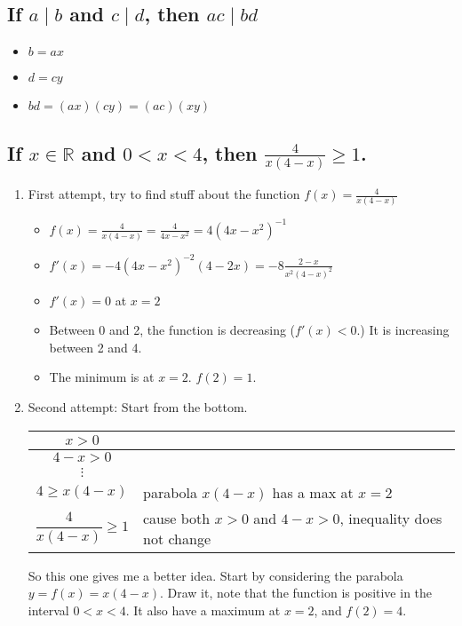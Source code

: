 \documentclass[11pt, oneside]{amsart}
\begin{document}
\subsection{If \(a \mid b\) and \(c \mid d\), then \(ac \mid bd\)}
\label{sec:orgd0de981}
\begin{itemize}
\item \(b=ax\)
\item \(d=cy\)
\item \(bd = (ax)(cy)=(ac)(xy)\)
\end{itemize}

\subsection{If \(x \in \mathbb{R}\) and \(0 < x < 4\), then \(\frac{4}{x(4-x)} \geq 1\).}
\label{sec:orgdd5040f}

\begin{enumerate}
\item First attempt, try to find stuff about the function \(f(x) = \frac{4}{x(4-x)}\)
\label{sec:org19d3997}
\begin{itemize}
\item \(f(x) = \frac{4}{x(4-x)} = \frac{4}{4x-x^2} = 4(4x-x^2)^{-1}\)
\item \(f'(x) = -4(4x-x^2)^{-2}(4-2x) = -8\frac{2-x}{x^2(4-x)^2}\)
\item \(f'(x)=0\) at \(x=2\)
\item Between 0 and 2, the function is decreasing (\(f'(x)<0\).) It is increasing between 2 and 4.
\item The minimum is at \(x=2\). \(f(2)=1\).
\end{itemize}

\item Second attempt: Start from the bottom.
\label{sec:org0dfafae}
\begin{center}
\begin{tabular}{|c|l|}
\hline
\(x>0\) & \\
\hline
\(4-x>0\) & \\
\hline
\(\vdots\) & \\
\hline
\(4 \geq x(4-x)\) & parabola \(x(4-x)\) has a max at \(x=2\)\\
\hline
\(\dfrac{4}{x(4-x)} \geq 1\) & cause both \(x>0\) and \(4-x>0\), inequality does not change\\
\hline
\end{tabular}
\end{center}

So this one gives me a better idea.  Start by considering the parabola \(y = f(x) = x(4-x)\).  Draw it, note that the
function is positive in the interval \(0<x<4\).  It also have a maximum at \(x=2\), and \(f(2) = 4\).
\end{enumerate}
\end{document}

